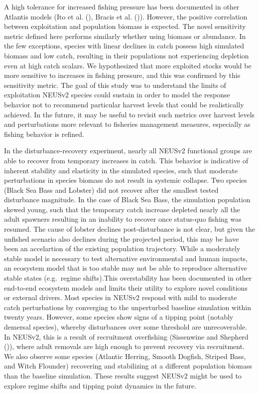 \documentclass[
]{article}
\begin{document}
A high tolerance for increased fishing pressure has been documented in other Atlantis models (Ito et al. (), Bracis et al. ()). However, the positive correlation between exploitation and population biomass is expected. The novel sensitivity metric defined here performs similarly whether using biomass or abundance. In the few exceptions, species with linear declines in catch possess high simulated biomass and low catch, resulting in their populations not experiencing depletion even at high catch scalars. We hypothesized that more exploited stocks would be more sensitive to increases in fishing pressure, and this was confirmed by this sensitivity metric. The goal of this study was to understand the limits of exploitation NEUSv2 species could sustain in order to model the response behavior not to recommend particular harvest levels that could be realistically achieved. In the future, it may be useful to revisit such metrics over harvest levels and perturbations more relevant to fisheries management measures, especially as fishing behavior is refined.

In the disturbance-recovery experiment, nearly all NEUSv2 functional groups are able to recover from temporary increases in catch. This behavior is indicative of inherent stability and elasticity in the simulated species, such that moderate perturbations in species biomass do not result in systemic collapse. Two species (Black Sea Bass and Lobster) did not recover after the smallest tested disturbance magnitude. In the case of Black Sea Bass, the simulation population skewed young, such that the temporary catch increase depleted nearly all the adult spawners resulting in an inability to recover once status-quo fishing was resumed. The cause of lobster declines post-disturbance is not clear, but given the unfished scenario also declines during the projected period, this may be have been an accelartion of the existing population trajectory. While a moderately stable model is necessary to test alternative environmental and human impacts, an ecosystem model that is too stable may not be able to reproduce alternative stable states (e.g.~regime shifts).This overstability has been documented in other end-to-end ecosystem models and limits their utility to explore novel conditions or external drivers. Most species in NEUSv2 respond with mild to moderate catch perturbations by converging to the unperturbed baseline simulation within twenty years. However, some species show signs of a tipping point (notably demersal species), whereby disturbances over some threshold are unrecoverable. In NEUSv2, this is a result of recruitment overfishing (Sissenwine and Shepherd ()), where adult removals are high enough to prevent recovery via recruitment. We also observe some species (Atlantic Herring, Smooth Dogfish, Striped Bass, and Witch Flounder) recovering and stabilizing at a different population biomass than the baseline simulation. These results suggest NEUSv2 might be used to explore regime shifts and tipping point dynamics in the future.
\end{document}

